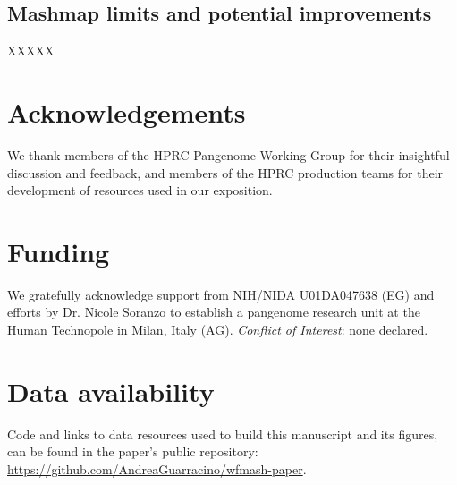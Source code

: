 \documentclass{bioinfo}
\theoremstyle{definition}
\begin{document}
\subsection{Mashmap limits and potential improvements}

XXXXX

\section*{Acknowledgements}

We thank members of the HPRC Pangenome Working Group for their insightful discussion and feedback, and members of the HPRC production teams for their development of resources used in our exposition.

\section*{Funding}

We gratefully acknowledge support from NIH/NIDA U01DA047638 (EG) and efforts by Dr. Nicole Soranzo to establish a pangenome research unit at the Human Technopole in Milan, Italy (AG).
\linebreak
\linebreak
\textit{Conflict of Interest}: none declared.

\section*{Data availability}

Code and links to data resources used to build this manuscript and its figures, can be found in the paper's public repository: \url{https://github.com/AndreaGuarracino/wfmash-paper}.





\end{document}
